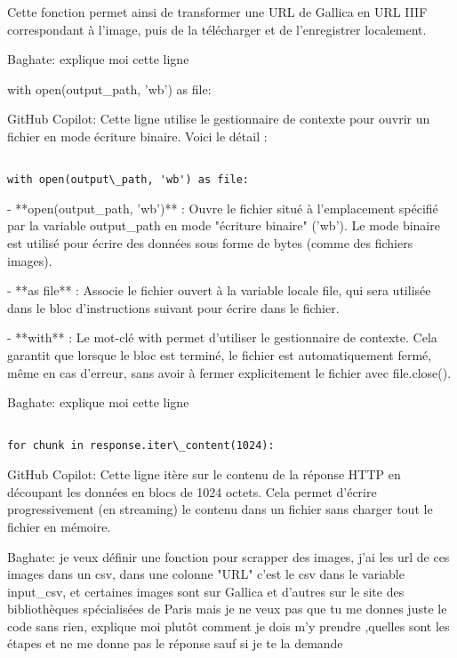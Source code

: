 Cette fonction permet ainsi de transformer une URL de Gallica en URL IIIF correspondant à l'image, puis de la télécharger et de l'enregistrer localement.

Baghate: explique moi cette ligne

with open(output\_path, 'wb') as file:

GitHub Copilot: Cette ligne utilise le gestionnaire de contexte pour ouvrir un fichier en mode écriture binaire. Voici le détail :

\begin{verbatim}

with open(output\_path, 'wb') as file:

\end{verbatim}

- **open(output\_path, 'wb')** : Ouvre le fichier situé à l'emplacement spécifié par la variable output\_path en mode "écriture binaire" ('wb'). Le mode binaire est utilisé pour écrire des données sous forme de bytes (comme des fichiers images).

- **as file** : Associe le fichier ouvert à la variable locale file, qui sera utilisée dans le bloc d'instructions suivant pour écrire dans le fichier.

- **with** : Le mot-clé with permet d'utiliser le gestionnaire de contexte. Cela garantit que lorsque le bloc est terminé, le fichier est automatiquement fermé, même en cas d'erreur, sans avoir à fermer explicitement le fichier avec file.close().

Baghate: explique moi cette ligne

\begin{verbatim}

for chunk in response.iter\_content(1024):

\end{verbatim}

GitHub Copilot: Cette ligne itère sur le contenu de la réponse HTTP en découpant les données en blocs de 1024 octets. Cela permet d'écrire progressivement (en streaming) le contenu dans un fichier sans charger tout le fichier en mémoire.

Baghate: je veux définir une fonction pour scrapper des images, j'ai les url de ces images dans un csv, dans une colonne "URL" c'est le csv dans le variable input\_csv, et certaines images sont sur Gallica et d'autres sur le site des bibliothèques spécialisées de Paris mais je ne veux pas que tu me donnes juste le code sans rien, explique moi plutôt comment je dois m'y prendre ,quelles sont les étapes et ne me donne pas le réponse sauf si je te la demande

